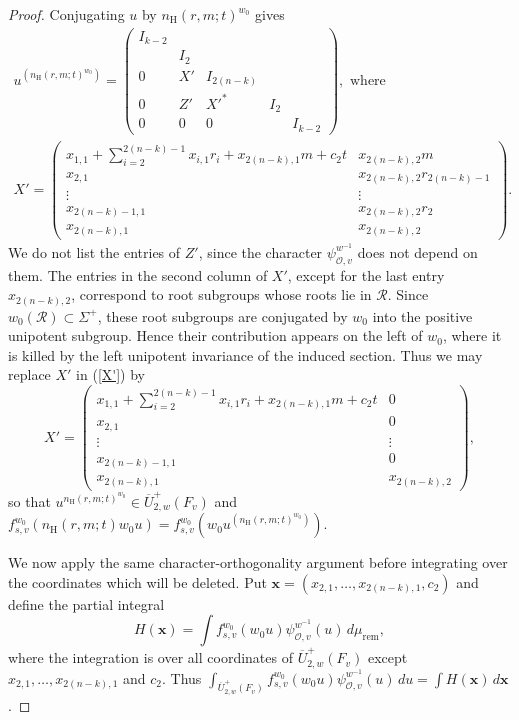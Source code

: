 \documentclass[11pt,notitlepage]{amsart}
\theoremstyle{definition}
\theoremstyle{remark}
\newcommand{\calO}{\mathcal{O}}
\newcommand{\nHeis}{n_{\mathrm{H}}}
\begin{document}
\begin{proof}
Conjugating $u$ by $\nHeis(r,m;t)^{w_0}$ gives
\begin{equation}\label{X'}
  \begin{split}
    u^{\left(\nHeis(r,m;t)^{w_0}\right)}
    = \begin{pmatrix} 
    I_{k-2}&&&&\\
    &I_2&&&\\
    0&X'&I_{2(n-k)}&&\\
    0&Z'&X'^\ast&I_2&\\
    0&0&0&&I_{k-2}\end{pmatrix},\text{ where }\\
    X'=\begin{pmatrix}
      x_{1,1} + \sum\limits_{i=2}^{2(n-k)-1}x_{i,1}r_i + x_{2(n-k),1}m+ c_2t&x_{2(n-k),2}m\\
      x_{2,1}&x_{2(n-k),2}r_{2(n-k)-1}\\
      \vdots & \vdots\\
      x_{2(n-k)-1,1}&x_{2(n-k),2}r_2\\
      x_{2(n-k),1}&x_{2(n-k),2}
    \end{pmatrix}.
  \end{split}
\end{equation}
We do not list the entries of \(Z'\), since the character
\(\psi^{w^{-1}}_{\calO,v}\) does not depend on them. The entries in the second column of \(X'\), except for the last entry
\(x_{2(n-k),2}\), correspond to root subgroups whose roots lie in
\(\mathcal R\). Since \(w_0(\mathcal R)\subset \Sigma^+\), these root
subgroups are conjugated by \(w_0\) into the positive unipotent subgroup.
Hence their contribution appears on the left of \(w_0\), where it is killed by the left unipotent invariance of the induced section. Thus we may replace $X'$ in (\ref{X'}) by
\[
X'=
\begin{pmatrix}
x_{1,1} + \sum\limits_{i=2}^{2(n-k)-1}x_{i,1}r_i + x_{2(n-k),1}m+ c_2t&0\\
x_{2,1}&0\\
\vdots&\vdots\\
x_{2(n-k)-1,1}&0\\
x_{2(n-k),1}&x_{2(n-k),2}
\end{pmatrix},
\]
so that $u^{\nHeis(r,m;t)^{w_0}}\in \overline{U}^{+}_{2,w}(F_v)$ and $f_{s,v}^{w_0}(\nHeis(r,m;t)w_0u) = f_{s,v}^{w_0}(w_0u^{(\nHeis(r,m;t)^{w_0})})$.

We now apply the same character-orthogonality argument before integrating
over the coordinates which will be deleted. Put $\mathbf x=(x_{2,1},\ldots,x_{2(n-k),1},c_2)$ and define the partial integral
\[
H(\mathbf x)=
\int
f^{w_0}_{s,v}(w_0u)\psi^{w^{-1}}_{\calO,v}(u)\,d\mu_{\mathrm{rem}},
\]
where the integration is over all coordinates of \(\overline U^+_{2,w}(F_v)\)
except \(x_{2,1},\ldots,x_{2(n-k),1}\) and \(c_2\). Thus
$\int_{\overline U^+_{2,w}(F_v)}
f^{w_0}_{s,v}(w_0u)\psi^{w^{-1}}_{\calO,v}(u)\,du
=
\int H(\mathbf x)\,d\mathbf x$.


\end{proof}
\end{document}
